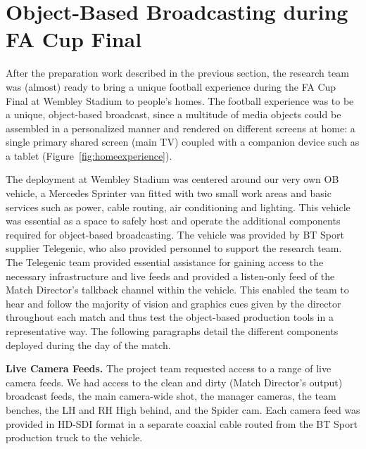 \documentclass[sigchi-a, authorversion]{acmart}
\begin{document}
\section{Object-Based Broadcasting during FA Cup Final}
After the preparation work described in the previous section, the research team
was (almost) ready to bring a unique football experience during the FA Cup Final
at Wembley Stadium to people's homes. The football experience was to be a unique, object-based broadcast, since a
multitude of media objects could be assembled in a personalized manner and rendered on
different screens at home: a single primary shared screen (main TV) coupled with
a companion device such as a tablet (Figure~\ref{fig:homeexperience}).


The deployment at Wembley Stadium was centered around our very own OB vehicle, a
Mercedes Sprinter van fitted with two small work areas and basic services
such as power, cable routing, air conditioning and lighting. This vehicle was
essential as a space to safely host and operate the additional components
required for object-based broadcasting. The vehicle was provided by BT Sport
supplier Telegenic, who also provided personnel to support the research team.
The Telegenic team provided essential assistance for gaining access to the
necessary infrastructure and live feeds and provided a listen-only feed of the
Match Director's talkback channel within the vehicle. This enabled the team to
hear and follow the majority of vision and graphics cues given by the director throughout each match and thus
test the object-based production tools in a representative way.
The following paragraphs detail the different components deployed during the day
of the match.

\vspace{5pt}\noindent\textbf{Live Camera Feeds.} The project team requested access to a range of live
camera feeds. We had access to the clean and dirty (Match Director's output)
broadcast feeds, the main camera-wide shot, the manager cameras, the team
benches, the LH and RH High behind, and the Spider cam. Each camera feed was
provided in HD-SDI format in a separate coaxial cable routed from the BT Sport
production truck to the vehicle.
\end{document}
